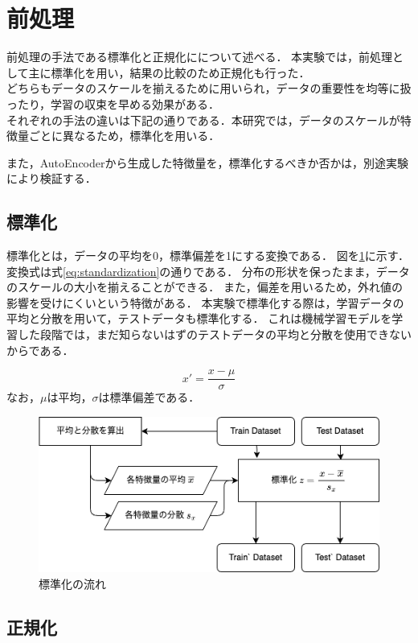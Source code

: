 \section{前処理}
前処理の手法である標準化と正規化にについて述べる．
本実験では，前処理として主に標準化を用い，結果の比較のため正規化も行った．\\
どちらもデータのスケールを揃えるために用いられ，データの重要性を均等に扱ったり，学習の収束を早める効果がある．\\
それぞれの手法の違いは下記の通りである．本研究では，データのスケールが特徴量ごとに異なるため，標準化を用いる．

また，AutoEncoderから生成した特徴量を，標準化するべきか否かは，別途実験により検証する．

\subsection{標準化}

標準化とは，データの平均を0，標準偏差を1にする変換である．
図を\ref{fig:standardization}に示す．
変換式は式\ref{eq:standardization}の通りである．
分布の形状を保ったまま，データのスケールの大小を揃えることができる．
また，偏差を用いるため，外れ値の影響を受けにくいという特徴がある．
本実験で標準化する際は，学習データの平均と分散を用いて，テストデータも標準化する．
これは機械学習モデルを学習した段階では，まだ知らないはずのテストデータの平均と分散を使用できないからである．

\begin{equation}
  \label{eq:standardization}
  x' = \frac{x - \mu}{\sigma}
\end{equation}
なお，$\mu$は平均，$\sigma$は標準偏差である．

\begin{figure}[htbp]
  \centering
  \includegraphics[width=0.6\linewidth]{figures/standardization.png}
  \caption{標準化の流れ}
  \label{fig:standardization}
\end{figure}

\subsection{正規化}

